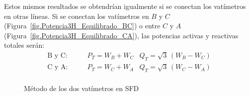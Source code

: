 \documentclass[11pt]{book} %
\numberwithin{dummy}{section}
\theoremstyle{ocrenumbox}
\theoremstyle{blacknumex}
\theoremstyle{blacknumbox}
\theoremstyle{ocrenum}
\begin{document}
Estos mismos resultados se obtendrían igualmente si se conectan los vatímetros en otras líneas. Si se conectan los vatímetros en $B$ y $C$ (Figura~\ref{fig.Potencia3H_Equilibrado_BC}) o entre $C$ y $A$ (Figura~\ref{fig.Potencia3H_Equilibrado_CA}), las potencias activas y reactivas totales serán: 
\begin{align*}
    \text{B y C}: &\qquad P_T=W_B + W_C  &Q_T=\sqrt{3}\,(W_B - W_C)\\
    \text{C y A}: &\qquad P_T=W_C + W_A  &Q_T=\sqrt{3}\,(W_C - W_A)\\
\end{align*}
\begin{figure}[htbp]
    \centering
    \hfill
    \caption{Método de los dos vatímetros en SFD}
\end{figure}
  
\end{document}
